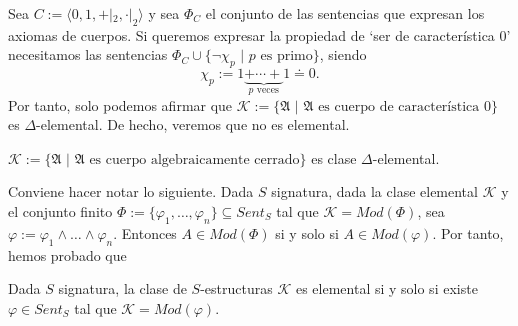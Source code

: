 \begin{example}
Sea $C := \langle 0, 1, +|_2, \cdot|_2\rangle$ y sea $\Phi_C$ el conjunto de las sentencias que expresan los axiomas de cuerpos. Si queremos expresar la propiedad de `ser de característica 0' necesitamos las sentencias $\Phi_C \cup \{\neg \chi_p \, \, | \, \, p \text{ es primo}\}$, siendo $$\chi_{p} := 1  \underbrace{+ \cdots +}_\text{$p$ veces} 1 \doteq 0.$$ Por tanto, solo podemos afirmar que $\mathcal{K}:=\{\mathfrak{A} \, \, | \, \, \mathfrak{A} \text{ es cuerpo de característica 0}\}$ es $\Delta$-elemental. De hecho, veremos que no es elemental.
\end{example}

\begin{example}
$\mathcal{K} := \{\mathfrak{A} \, \, | \, \, \mathfrak{A} \text{ es cuerpo algebraicamente cerrado}\}$ es clase $\Delta$-elemental.
\end{example}


Conviene hacer notar lo siguiente. Dada $S$ signatura, dada la clase elemental $\mathcal{K}$ y el conjunto finito $\Phi := \{\varphi_1, \dots, \varphi_n\}\subseteq Sent_S$ tal que $\mathcal{K} = Mod(\Phi)$, sea $\varphi := \varphi_1  \land \dots \land \varphi_n$. Entonces $A \in Mod(\Phi)$ si y solo si $A \in Mod(\varphi)$. Por tanto, hemos probado que

\begin{prop}
Dada $S$ signatura, la clase de $S$-estructuras $\mathcal{K}$ es elemental si y solo si existe $\varphi \in Sent_S$ tal que $\mathcal{K} = Mod(\varphi)$.
\end{prop}

